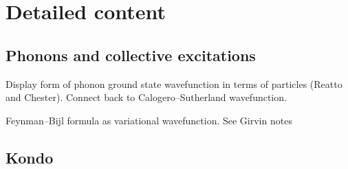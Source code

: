 \section{Detailed content}

\subsection{Phonons and collective excitations}

Display form of phonon ground state wavefunction in terms of particles (Reatto and Chester). Connect back to Calogero--Sutherland wavefunction. 

Feynman--Bijl formula as variational wavefunction. See Girvin notes

\subsection{Kondo}
